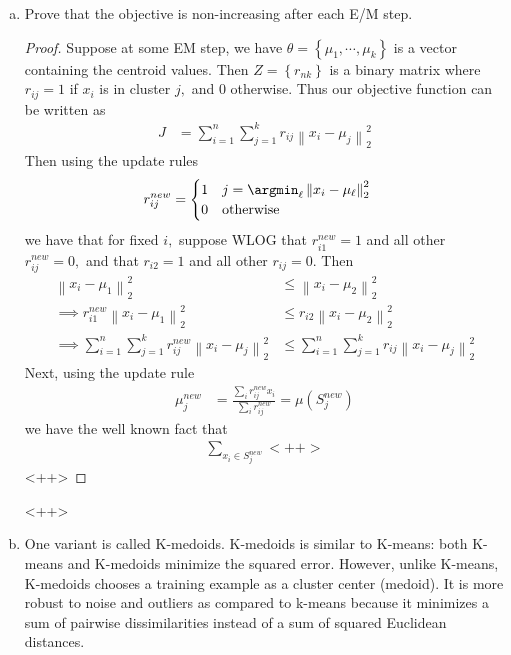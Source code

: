 \documentclass{article}
\begin{document}
\begin{enumerate}[(a)]
	\item Prove that the objective is non-increasing after each E/M step.
		\begin{proof}
			Suppose at some EM step, we have $\theta=\left\{ \mu_1, \cdots, \mu_k \right\}$ is a vector containing the centroid values. Then $Z=\left\{ r_{nk} \right\}$ is a binary matrix where $r_{ij}=1$ if $x_i$ is in cluster $j,$ and 0 otherwise. Thus our objective function can be written as
			\begin{align*}
				J &= \sum_{i=1}^{n} \sum_{j=1}^{k} r_{ij} \left\lVert x_i-\mu_j \right\rVert_2^2
			\end{align*}
			Then using the update rules
			\begin{align*}
				r_{ij}^{new} &= \begin{cases}
					1 & j=\argmin_{\ell} \left\lVert x_i-\mu_\ell \right\rVert_2^2 \\
					0 & \text{otherwise}
				\end{cases}
			\end{align*}
			we have that for fixed $i,$ suppose WLOG that $r_{i1}^{new}=1$ and all other $r_{ij}^{new}=0,$ and that $r_{i2}=1$ and all other $r_{ij}=0.$ Then
			\begin{align*}
				\left\lVert x_i-\mu_1 \right\rVert_2^2 &\le \left\lVert x_i-\mu_2 \right\rVert_2^2 \\ 
				\implies r_{i1}^{new}\left\lVert x_i-\mu_1 \right\rVert_2^2 &\le r_{i2}\left\lVert x_i-\mu_2 \right\rVert_2^2 \\
				\implies \sum_{i=1}^{n} \sum_{j=1}^{k} r_{ij}^{new} \left\lVert x_i-\mu_j \right\rVert_2^2&\le \sum_{i=1}^{n} \sum_{j=1}^{k} r_{ij} \left\lVert x_i-\mu_j \right\rVert_2^2
			\end{align*}
			Next, using the update rule
			\begin{align*}
				\mu_j^{new} &= \frac{\sum_{i}^{}r_{ij}^{new} x_i}{\sum_{i}^{}r_{ij}^{new}} = \mu(S_j^{new})
			\end{align*}
			we have the well known fact that
			\begin{align*}
				\sum_{x_i\in S_j^{new}}^{}<++>
			\end{align*}<++>
		\end{proof}<++>

	\item One variant is called K-medoids. K-medoids is similar to K-means: both K-means and K-medoids minimize the squared error. However, unlike K-means, K-medoids chooses a training example as a cluster center (medoid). It is more robust to noise and outliers as compared to k-means because it minimizes a sum of pairwise dissimilarities instead of a sum of squared Euclidean distances. 


\end{enumerate}
\end{document}
